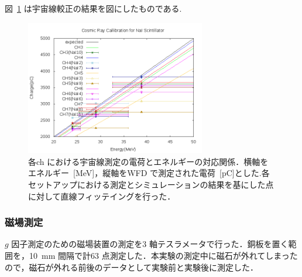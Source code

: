 図~\ref{cali} は宇宙線較正の結果を図にしたものである.
\begin{figure}[H]
\centering
\includegraphics[width=0.7\textwidth]{figure/tajima/fit.png}
\caption{各ch における宇宙線測定の電荷とエネルギーの対応関係．横軸をエネルギー~[MeV]，縦軸をWFD で測定された電荷~[pC]とした.各セットアップにおける測定とシミュレーションの結果を基にした点に対して直線フィッテイングを行った．}\label{cali}
\end{figure}

\newpage

\subsubsection{磁場測定}
$g$ 因子測定のための磁場装置の測定を3 軸テスラメータで行った．銅板を置く範囲を，10~mm 間隔で計63 点測定した．本実験の測定中に磁石が外れてしまったので，磁石が外れる前後のデータとして実験前と実験後に測定した．

